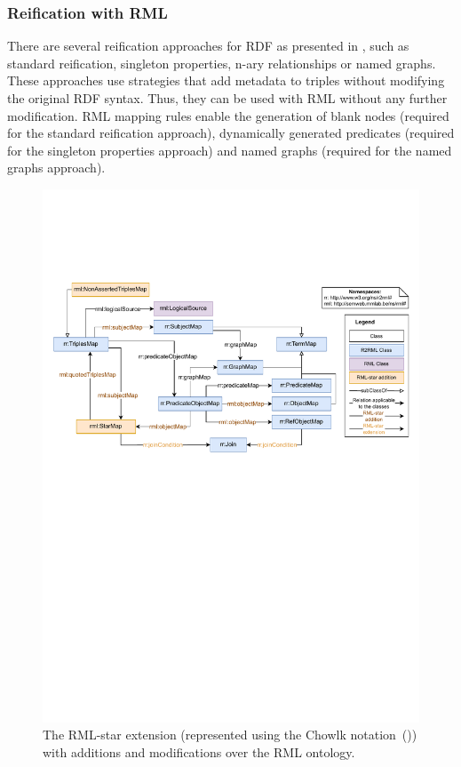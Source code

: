 \subsubsection{Reification with RML}

There are several reification approaches for RDF as presented in , such as standard reification, singleton properties, n-ary relationships or named graphs. 
These approaches use strategies that add metadata to triples
without modifying the original RDF syntax.
Thus, they can be used with RML without any further modification. RML mapping rules enable the generation of blank nodes (required for the standard reification approach), dynamically generated predicates (required for the singleton properties approach) and named graphs (required for the named graphs approach). 

\begin{figure}[!t]
\centering
\includegraphics[width=1\linewidth]{figures/rml-star_diagram.pdf}
\caption{The \mbox{RML-star} extension (represented using the Chowlk notation~(\cite{feria2022chowlk})) with additions and modifications over the RML ontology.}
\label{fig:rml-star}
\end{figure}


